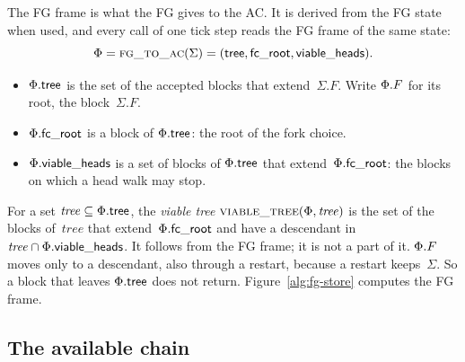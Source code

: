 The FG frame is what the FG gives to the AC.  It is derived from the FG
state when used, and every call of one tick step reads the FG frame of the
same state:
\[
 \Fr=\Call{fg\_to\_ac}{\Sigma}=(\tree,\fcroot,\allowed).
\]
\begin{itemize}
\item $\Phi.\mathsf{tree}$ is the set of the accepted blocks that
  extend~$\Sigma.F$.  Write $\Phi.F$ for its root, the block~$\Sigma.F$.
\item $\Phi.\mathsf{fc\_root}$ is a block of $\Phi.\mathsf{tree}$: the root of the fork
  choice.
\item $\Phi.\mathsf{viable\_heads}$ is a set of blocks of $\Phi.\mathsf{tree}$ that
  extend~$\Phi.\mathsf{fc\_root}$: the blocks on which a head walk may stop.
\end{itemize}
For a set $\mathit{tree}\subseteq\Phi.\mathsf{tree}$, the \emph{viable tree}
$\text{\textsc{viable\_tree}}(\Phi,\mathit{tree})$ is the set of the blocks of~$\mathit{tree}$
that extend~$\Phi.\mathsf{fc\_root}$ and have a descendant in
$\mathit{tree}\cap\Phi.\mathsf{viable\_heads}$.  It follows from the FG frame; it is not a
part of it.
$\Phi.F$ moves only to a descendant, also through a restart, because a
restart keeps~$\Sigma$.  So a block that leaves $\Phi.\mathsf{tree}$ does not
return.  Figure~\ref{alg:fg-store} computes the FG frame.

\subsection{The available chain}\label{sec:ac-interface}


